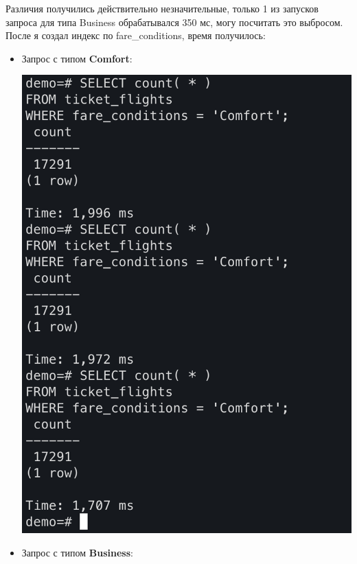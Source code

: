 \documentclass[a4paper,12pt]{article}
\begin{document}
Различия получились действительно незначительные, только 1 из запусков запроса для типа Business обрабатывался 350 мс, могу посчитать это выбросом. После я создал индекс по fare\_conditions, время получилось:
\begin{itemize}
\item Запрос с типом \textbf{Comfort}:
\begin{center}
\includegraphics[scale=0.4]{24.png}
\end{center}
\item Запрос с типом \textbf{Business}:
\begin{center}

\end{center}
\end{itemize}
\end{document}

